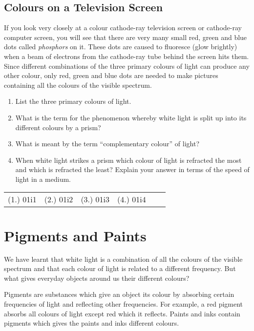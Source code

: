 \subsection{Colours on a Television Screen}
If you look very closely at a colour cathode-ray television screen or cathode-ray computer screen, you will see that there are very many small red, green and blue dots called \textit{phosphors} on it. These dots are caused to fluoresce (glow brightly) when a beam of electrons from the cathode-ray tube behind the screen hits them. Since different combinations of the three primary colours of light can produce any other colour, only red, green and blue dots are needed to make pictures containing all the colours of the visible spectrum.

{
\begin{enumerate}
\item List the three primary colours of light.
\item What is the term for the phenomenon whereby white light is split up into its different colours by a prism?
\item What is meant by the term ``complementary colour'' of light?
\item When white light strikes a prism which colour of light is refracted the most and which is refracted the least? Explain your answer in terms of the speed of light in a medium.
\end{enumerate}

\par \practiceinfo
\par \begin{tabular}[h]{cccccc}
(1.)	01i1	&
(2.)	01i2	&
(3.)	01i3	&
(4.)	01i4	&
\end{tabular}
}


\section{Pigments and Paints}

We have learnt that white light is a combination of all the colours of the visible spectrum and that each colour of light is related to a different frequency. But what gives everyday objects around us their different colours? 

Pigments are substances which give an object its colour by absorbing certain frequencies of light and reflecting other frequencies. For example, a red pigment absorbs all colours of light except red which it reflects. Paints and inks contain pigments which gives the paints and inks different colours. 

